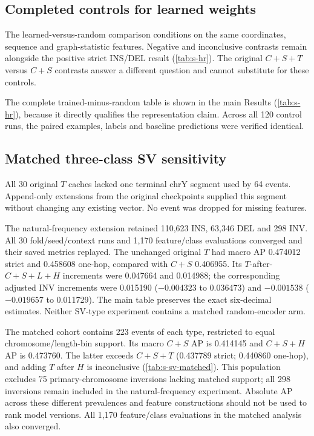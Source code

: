 \subsection{Completed controls for learned weights}

The learned-versus-random comparison conditions on the same coordinates, sequence and graph-statistic features. Negative and inconclusive contrasts remain alongside the positive strict INS/DEL result (\cref{tab:s-hr}). The original $C+S+T$ versus $C+S$ contrasts answer a different question and cannot substitute for these controls.

The complete trained-minus-random table is shown in the main Results (\cref{tab:s-hr}), because it directly qualifies the representation claim. Across all 120 control runs, the paired examples, labels and baseline predictions were verified identical.

\subsection{Matched three-class SV sensitivity}

All 30 original $T$ caches lacked one terminal chrY segment used by 64 events. Append-only extensions from the original checkpoints supplied this segment without changing any existing vector. No event was dropped for missing features.

The natural-frequency extension retained 110,623 INS, 63,346 DEL and 298 INV. All 30 fold/seed/context runs and 1,170 feature/class evaluations converged and their saved metrics replayed. The unchanged original $T$ had macro AP 0.474012 strict and 0.458608 one-hop, compared with $C+S$ 0.406955. Its $T$-after-$C+S+L+H$ increments were 0.047664 and 0.014988; the corresponding adjusted INV increments were 0.015190 (\CI $-0.004323$ to 0.036473) and $-0.001538$ ($-0.019657$ to 0.011729). The main table preserves the exact six-decimal estimates. Neither SV-type experiment contains a matched random-encoder arm.


The matched cohort contains 223 events of each type, restricted to equal chromosome/length-bin support. Its macro $C+S$ AP is 0.414145 and $C+S+H$ AP is 0.473760. The latter exceeds $C+S+T$ (0.437789 strict; 0.440860 one-hop), and adding $T$ after $H$ is inconclusive (\cref{tab:s-sv-matched}). This population excludes 75 primary-chromosome inversions lacking matched support; all 298 inversions remain included in the natural-frequency experiment. Absolute AP across these different prevalences and feature constructions should not be used to rank model versions. All 1,170 feature/class evaluations in the matched analysis also converged.

